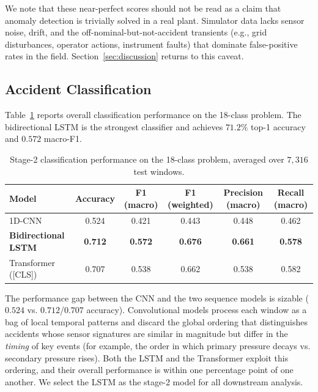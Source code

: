 We note that these near-perfect scores should not be read as a claim that anomaly detection is trivially solved in a real plant. Simulator data lacks sensor noise, drift, and the off-nominal-but-not-accident transients (e.g., grid disturbances, operator actions, instrument faults) that dominate false-positive rates in the field. Section~\ref{sec:discussion} returns to this caveat.

\subsection{Accident Classification}
\label{sec:results-clf}

Table~\ref{tab:clf} reports overall classification performance on the 18-class problem. The bidirectional LSTM is the strongest classifier and achieves $71.2\%$ top-1 accuracy and $0.572$ macro-F1.

\begin{table}[H]
    \centering
    \small
    \caption{Stage-2 classification performance on the 18-class \nppad{} problem, averaged over $7{,}316$ test windows.}
    \label{tab:clf}
    \begin{tabular}{@{}lccccc@{}}
        \toprule
        Model & Accuracy & F1 (macro) & F1 (weighted) & Precision (macro) & Recall (macro) \\
        \midrule
        1D-CNN & 0.524 & 0.421 & 0.443 & 0.448 & 0.462 \\
        \textbf{Bidirectional LSTM} & \textbf{0.712} & \textbf{0.572} & \textbf{0.676} & \textbf{0.661} & \textbf{0.578} \\
        Transformer ([CLS]) & 0.707 & 0.538 & 0.662 & 0.538 & 0.582 \\
        \bottomrule
    \end{tabular}
\end{table}

The performance gap between the CNN and the two sequence models is sizable ($0.524$ vs. $0.712$/$0.707$ accuracy). Convolutional models process each window as a bag of local temporal patterns and discard the global ordering that distinguishes accidents whose sensor signatures are similar in magnitude but differ in the \emph{timing} of key events (for example, the order in which primary pressure decays vs. secondary pressure rises). Both the LSTM and the Transformer exploit this ordering, and their overall performance is within one percentage point of one another. We select the LSTM as the stage-2 model for all downstream analysis.

